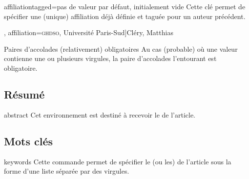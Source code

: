 \begin{docKey}{affiliationtagged}{={}}{pas de valeur par défaut,
    initialement vide}
  Cette clé permet de spécifier une (unique) affiliation déjà définie et taguée
  pour un auteur précédent.
\end{docKey}


\begin{bodycode}[listing options={deletekeywords={author}}]
\author[
  affiliation={Laboratoire \textsc{sphere}, Université Paris Diderot}
  ]{Bustamante, Martha-Cecilia}
\author[
  affiliation=[aff2]{\textsc{lpma}, Université Pierre et Marie Curie},
  affiliation={\textsc{ghdso}, Université Paris-Sud}]{Cléry, Matthias}
\author[
  affiliationtagged={aff2}
]{Mazliak, Laurent}
\end{bodycode}

\begin{dbwarning}{Paires d'accolades
    (relativement) obligatoires}{}
  Au cas (probable) où une valeur  contienne une ou plusieurs
  virgules, la paire d'accolades l'entourant est obligatoire.
\end{dbwarning}

\subsection{Résumé}
\label{sec-resume}

\begin{docEnvironment}[doc description=\mandatory,doclang/environment content=résumé]{abstract}{}
  Cet environnement est destiné à recevoir le  de l'article.
\end{docEnvironment}

\subsection{Mots clés}

\begin{docCommand}[doc description=\mandatory]{keywords}{}
  Cette commande permet de spécifier le (ou les)  de
  l'article sous la forme d'une liste séparée par des virgules.
\end{docCommand}

